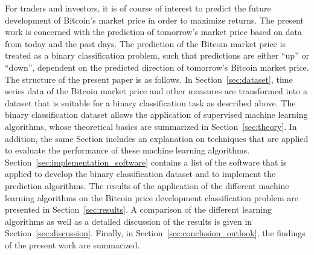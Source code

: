 For traders and investors, it is of course of interest to predict the future development of Bitcoin's market price in order to maximize returns. The present work is concerned with the prediction of tomorrow's market price based on data from today and the past days. The prediction of the Bitcoin market price is treated as a binary classification problem, such that predictions are either \enquote{up} or \enquote{down}, dependent on the predicted direction of tomorrow's Bitcoin market price.\\

The structure of the present paper is as follows. In Section~\ref{sec:dataset}, time series data of the Bitcoin market price and other measures are transformed into a dataset that is suitable for a binary classification task as described above. The binary classification dataset allows the application of supervised machine learning algorithms, whose theoretical basics are summarized in Section~\ref{sec:theory}. In addition, the same Section includes an explanation on techniques that are applied to evaluate the performance of these machine learning algorithms. Section~\ref{sec:implementation_software} contains a list of the software that is applied to develop the binary classification dataset and to implement the prediction algorithms. The results of the application of the different machine learning algorithms on the Bitcoin price development classification problem are presented in Section~\ref{sec:results}. A comparison of the different learning algorithms as well as a detailed discussion of the results is given in Section~\ref{sec:discussion}. Finally, in Section~\ref{sec:conclusion_outlook}, the findings of the present work are summarized.